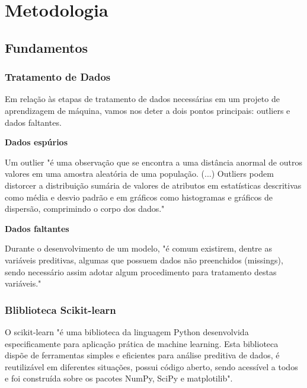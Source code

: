 

\chapter[Metodologia]{Metodologia}

    \section{Fundamentos}
    
        \subsection{Tratamento de Dados}
            Em relação às etapas de tratamento de dados necessárias em um projeto de aprendizagem de máquina, vamos nos deter a dois pontos principais: outliers e dados faltantes.\newline 
        
            \textbf{Dados espúrios}\par
            Um outlier "é uma observação que se encontra a uma distância anormal de outros valores em uma amostra aleatória de uma população. (...) Outliers podem distorcer a distribuição sumária de valores de atributos em estatísticas descritivas como média e desvio padrão e em gráficos como histogramas e gráficos de dispersão, comprimindo o corpo dos dados." \cite{portal2018}\newline
        
            \textbf{Dados faltantes}\par
            Durante o desenvolvimento de um modelo, "é comum existirem, dentre as variáveis preditivas, algumas que possuem dados não preenchidos (missings), sendo necessário assim adotar algum procedimento para tratamento destas variáveis." \cite{assuncao2012}\newline

	    \subsection{Bliblioteca Scikit-learn}
	    O scikit-learn "é uma biblioteca da linguagem Python desenvolvida especificamente para aplicação prática de machine learning. Esta biblioteca dispõe de ferramentas simples e eficientes para análise preditiva de dados, é reutilizável em diferentes situações, possui código aberto, sendo acessível a todos e foi construída sobre os pacotes NumPy, SciPy e matplotilib". \cite{didatica2020}

